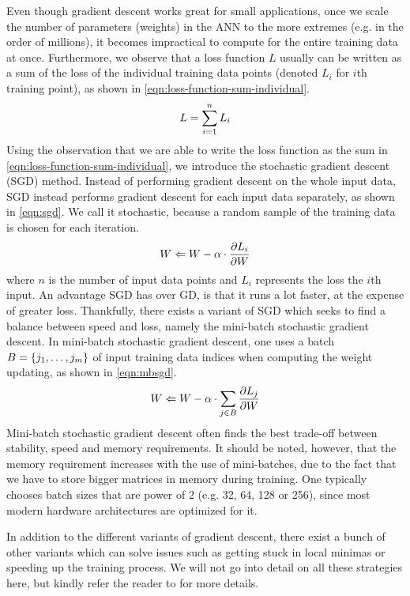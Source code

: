 Even though gradient descent works great for small applications, once we scale the number of parameters (weights) in the ANN to the more extremes (e.g. in the order of millions), it becomes impractical to compute for the entire training data at once. Furthermore, we observe that a loss function $L$ usually can be written as a sum of the loss of the individual training data points (denoted $L_i$ for $i$th training point), as shown in \cref{eqn:loss-function-sum-individual}.
\begin{align}
    \label{eqn:loss-function-sum-individual}
    L = \sum\limits_{i=1}^{n} L_i
\end{align}
Using the observation that we are able to write the loss function as the sum in \cref{eqn:loss-function-sum-individual}, we introduce the stochastic gradient descent (SGD) method. Instead of performing gradient descent on the whole input data, SGD instead performs gradient descent for each input data separately, as shown in \cref{eqn:sgd}. We call it stochastic, because a random sample of the training data is chosen for each iteration.
\begin{align}
    \label{eqn:sgd}
    W \Leftarrow W - \alpha \cdot \frac{\partial L_i}{\partial W}
\end{align}
where $n$ is the number of input data points and $L_i$ represents the loss the $i$th input. An advantage SGD has over GD, is that it runs a lot faster, at the expense of greater loss. Thankfully, there exists a variant of SGD which seeks to find a balance between speed and loss, namely the mini-batch stochastic gradient descent. In mini-batch stochastic gradient descent, one uses a batch $B=\left\{j_1, \ldots, j_m\right\}$ of input training data indices when computing the weight updating, as shown in \cref{eqn:mbsgd}.
\begin{align}
    \label{eqn:mbsgd}
    W \Leftarrow W - \alpha \cdot \sum\limits_{j \in B}^{} \frac{\partial L_j}{\partial W}
\end{align}
Mini-batch stochastic gradient descent often finds the best trade-off between stability, speed and memory requirements. It should be noted, however, that the memory requirement increases with the use of mini-batches, due to the fact that we have to store bigger matrices in memory during training. One typically chooses batch sizes that are power of 2 (e.g. 32, 64, 128 or 256), since most modern hardware architectures are optimized for it.

In addition to the different variants of gradient descent, there exist a bunch of other variants which can solve issues such as getting stuck in local minimas or speeding up the training process. We will not go into detail on all these strategies here, but kindly refer the reader to \cite[Chapter 3.5]{Aggarwal18} for more details.

